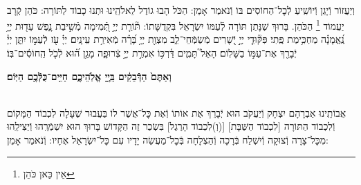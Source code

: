 \documentclass[twoside, openany, parskip=half, 11pt]{book}
\begin{document}
\avharachamim

\\
וְיַעֲזוֹר וְֿיָגֵן וְֿיוֹשִֽׁיעַ לְֿכׇל־הַחוֹסִים בּוֹ וְֿנֹאמַר אָמֵן:
 הַכֹּל הָבוּ גוֹדֶל לֵאלֹהֵֽינוּ וּתְנוּ כָבוֹד לַתּוֹרָה: כֹּהֵן קְֿרָב יַעֲמוֹד
 \footnote{ אֵין כַּאן כֹּהֵן}
 הַכֹּהֵן. בָּרוּךְ שֶׁנָּתַן תּוֹרָה לְֿעַמּוֹ יִשְׂרָאֵל בִּקְדֻשָּׁתוֹ:
תּ֘וֹרַ֤ת יְיָ֣ תְּֿ֭מִימָה מְֿשִׁ֣יבַת נָ֑פֶשׁ עֵד֖וּת יְיָ֥ נֶֽ֝אֱמָנָ֗ה מַחְכִּ֥ימַת פֶּֽתִי׃ פִּקּ֘וּדֵ֤י יְיָ֣ יְֿ֭שָׁרִים מְֿשַׂמְּֿחֵי־לֵ֑ב מִצְוַ֖ת יְיָ֥ בָּ֝רָ֗ה מְֿאִירַ֥ת עֵינָֽיִם׃
 יְיָ֗ עֹ֖ז לְֿעַמּ֣וֹ יִתֵּ֑ן יְיָ֓ יְֿבָרֵ֖ךְ אֶת־עַמּ֣וֹ בַשָּׁלֽוֹם׃
 הָאֵל֮ תָּמִ֢ים דַּ֫רְכּ֥וֹ אִמְרַ֣ת יְיָ֣ צְֿרוּפָ֑ה מָגֵ֥ן ה֝֗וּא לְֿכֹ֤ל הַֽחוֹסִ֬ים־בּֽוֹ׃


\textbf{וְאַתֶּם֙ הַדְּֿבֵקִ֔ים בַּֽיְ֖יָ אֱלֹֽהֵיכֶ֑ם חַיִּ֥ים־כֻּלְּֿכֶ֖ם הַיּֽוֹם׃} 

\nextpage

\torahbarachu

\hagomel

\\
 אֲבוֹתֵֽינוּ אַבְרָהָם יִצְחָק וְֿיַעֲקֹב הוּא יְֿבָרֵךְ אֶת
 אוֹתוֹ וְֿאֶת כׇּל־אֲשֶׁר לוֹ
בַּעֲבוּר שֶׁעָלָה לִכְבוֹד הַמָּקוֹם וְֿלִכְבוֹד הַתּוֹרָה
[לִכְבוֹד הַשַּׁבָּת]
[(וְ)לִכְבוֹד הָרֶגֶל]
 בִּשְׂכַר זֶה הַקָּדוֹשׁ בָּרוּךְ הוּא יִשְׁמְֿרֵֽהוּ וְֿיַצִּילֵֽהוּ מִכׇּל־צָרָה וְֿצוּקָה וְֿיִשְׁלַח בְּֿרָכָה וְֿהַצְלָחָה בְּֿכׇל־מַעֲשֵׂה יָדָיו עִם כׇּל־יִשְׂרָאֵל אֶחָיו: וְֿנֹאמַר אָמֵן:
\end{document}
